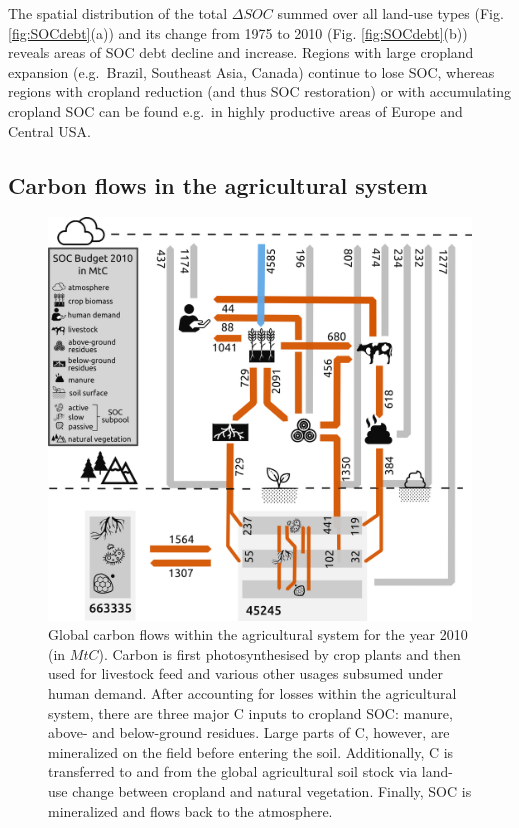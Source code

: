\documentclass[gc, manuscript]{copernicus}
\begin{document}
The spatial distribution of the total \(\Delta SOC\) summed over all land-use types (Fig. \ref{fig:SOCdebt}(a)) and its change from 1975 to 2010 (Fig. \ref{fig:SOCdebt}(b)) reveals areas of SOC debt decline and increase.
Regions with large cropland expansion (e.g.~Brazil, Southeast Asia, Canada) continue to lose SOC, whereas regions with cropland reduction (and thus SOC restoration) or with accumulating cropland SOC can be found e.g.~in highly productive areas of Europe and Central USA.

\hypertarget{carbon-flows-in-the-agricultural-system}{%
\subsection{Carbon flows in the agricultural system}\label{carbon-flows-in-the-agricultural-system}}

\begin{figure}[h]
\includegraphics[width=16cm]{../ResultNotebooks/Output/Images/CarbonBudget} \caption{Global carbon flows within the agricultural system for the year 2010 (in $\unit{MtC}$). Carbon is first photosynthesised by crop plants and then used for livestock feed and various other usages subsumed under human demand. After accounting for losses within the agricultural system, there are three major C inputs to cropland SOC: manure, above- and below-ground residues. Large parts of C, however, are mineralized on the field before entering the soil. Additionally, C is transferred to and from the global agricultural soil stock via land-use change between cropland and natural vegetation. Finally, SOC is mineralized and flows back to the atmosphere.}\label{fig:FlowFig}
\end{figure}
\end{document}
